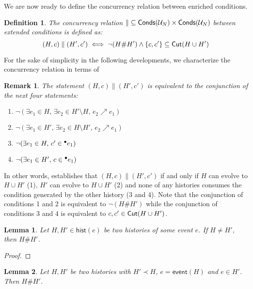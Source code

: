 \documentclass{article}
\newtheorem{definition}{Definition}
\newtheorem{lemma}{Lemma}
\newtheorem{remark}{Remark}
\newcommand{\event}[1]{\ensuremath{\mathsf{event}(#1)}}
\newcommand{\hist}[1]{\ensuremath{\mathsf{hist}(#1)}}
\newcommand{\conds}[1]{\ensuremath{\mathsf{Conds}(#1)}}
\newcommand{\confl}{\ensuremath{\mathord{\#}}}
\begin{document}
We are now ready to define the concurrency relation between enriched
conditions.

\begin{definition}
The \emph{concurrency relation} $\mathord\parallel \subseteq \conds{\unf N}
\times \conds{\unf N}$ between extended conditions is defined as: $$ (H, c)
\parallel (H', c') \iff \lnot (H \confl H') \land \{c, c'\} \subseteq \cut{H
\cup H'}$$
\end{definition}

For the sake of simplicity in the following developments, we characterize the
concurrency relation in terms of 

\begin{remark}
\label{rmk:the.statement}
The statement $(H, c) \parallel (H', c')$ is equivalent to the conjunction of
the next four statements:
\begin{enumerate}
\item $\lnot (\exists e_1 \in H,\, \exists e_2 \in H' \setminus H,\, e_2
\nearrow e_1)$
\item $\lnot (\exists e_1 \in H',\, \exists e_2 \in H \setminus H',\, e_2
\nearrow e_1)$
\item $\lnot (\exists e_1 \in H,\, c' \in {}^\bullet e_1)$
\item $\lnot (\exists e_1 \in H',\, c \in {}^\bullet e_1)$
\end{enumerate}
\end{remark}

In other words,  establishes that $(H, c) \parallel (H',
c')$ if and only if $H$ can evolve to $H \cup H'$ (1), $H'$ can evolve to $H
\cup H'$ (2) and none of any histories consumes the condition generated by the
other history (3 and 4).  Note that the conjunction of conditions 1 and 2 is
equivalent to $\lnot (H \confl H')$ while the conjunction of conditions 3 and 4
is equivalent to $c, c' \in \mathsf{Cut }{(H \cup H')}$.

\begin{lemma}
\label{lem:let.H}
Let $H, H' \in \hist{e}$ be two histories of some event $e$.  If $H \not= H'$,
then $H \confl H'$.
\end{lemma}

\begin{proof}
\end{proof}

\begin{lemma}
\label{lem:two.histories}
Let $H, H'$ be two histories with $H' \prec H$, $e = \event{H}$ and $e \in H'$.
Then $H \confl H'$.
\end{lemma}
\end{document}
